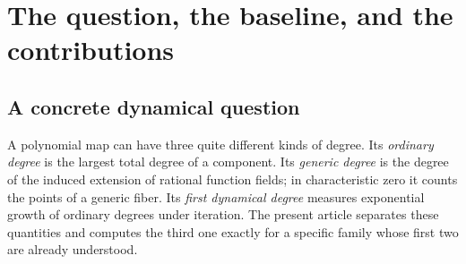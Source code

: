 \documentclass[11pt,a4paper]{article}
\numberwithin{equation}{section}
\theoremstyle{definition}
\theoremstyle{remark}
\begin{document}
\begin{abstract}
We study the iterates of the explicit three-dimensional polynomial map
in ProveIt's Jacobian-conjecture development. We prove that their degrees
are $1,7,43,265,\ldots$, satisfy $d_{n+2}=6d_{n+1}+d_n$, and have first
dynamical degree $3+\sqrt{10}$. This establishes the value suggested in
Liam Giannini's publicly available July 2026 record description; it is
not a claim about the contents of an inaccessible full manuscript or
about global priority. The proof gives considerably more than a limit:
all positive weighted degrees are explicit, the upper Newton geometry
has just two vertices per coordinate, and every initial form on the
intervening wall is a monomial times a power of $xz+3y$.

For every nonzero polynomial $h$ of degree $m$, the source shear
$T_h(x,y,z)=(x,y,z+y^2h(xy))$ produces a map $F_h=F\circ T_h$ with
\[
\lambda_1(F_h)=\frac{2m+7+\sqrt{4m^2+32m+61}}2.
\]
Thus one tame left--right equivalence class contains Keller maps of
fixed generic degree three and unbounded first dynamical degree. We
also determine the different degree laws in characteristic three.
Finally, a monomial-dominance theorem constructs a forward-invariant
complex escape region with a precise logarithmic asymptotic. For
integral coefficients it yields a Zariski-dense set of integral initial
points whose arithmetic degree equals the first dynamical degree.
The package contains thirteen groups of exact checks, a source and
claim ledger, a formalization roadmap, and ten further research
questions.
\end{abstract}
\tableofcontents
\newpage

\section{The question, the baseline, and the contributions}\label{kmd:sec:intro}

\subsection{A concrete dynamical question}
A polynomial map can have three quite different kinds of degree. Its
\emph{ordinary degree} is the largest total degree of a component. Its
\emph{generic degree} is the degree of the induced extension of rational
function fields; in characteristic zero it counts the points of a
generic fiber. Its \emph{first dynamical degree} measures exponential
growth of ordinary degrees under iteration. The present article
separates these quantities and computes the third one exactly for a
specific family whose first two are already understood.
\end{document}
